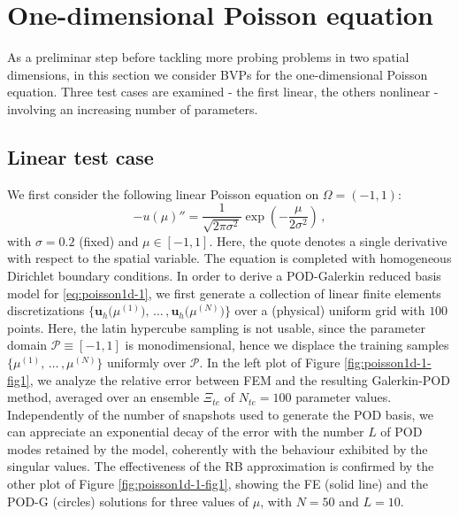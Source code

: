 \documentclass[12pt, a4paper, twoside, openright]{report}
\numberwithin{equation}{chapter}
\theoremstyle{theorem}
\theoremstyle{definition}
\theoremstyle{remark}
\theoremstyle{proposition}
\numberwithin{figure}{chapter}
\begin{document}
	\section{One-dimensional Poisson equation}
	\label{section:One-dimensional Poisson equation (results)}
	
		As a preliminar step before tackling more probing problems in two spatial dimensions, in this section we consider BVPs for the one-dimensional Poisson equation. Three test cases are examined - the first linear, the others nonlinear - involving an increasing number of parameters. 
		
	\vspace*{0.3cm}
	
	\subsection{Linear test case}
	\label{section:poisson1d-1}
	
		We first consider the following linear Poisson equation on $\Omega = (-1,1)$:
		\begin{equation}
			\label{eq:poisson1d-1}
			- u(\mu)'' = \dfrac{1}{\sqrt{2 \pi \sigma^2}} \exp \left( -\dfrac{\mu}{2 \sigma^2} \right) \, ,
		\end{equation}
		with $\sigma = 0.2$ (fixed) and $\mu \in [-1,1]$. Here, the quote denotes a single derivative with respect to the spatial variable. The equation is completed with homogeneous Dirichlet boundary conditions. In order to derive a POD-Galerkin reduced basis model for \eqref{eq:poisson1d-1}, we first generate a collection of linear finite elements discretizations $\big\lbrace \mathbf{u}_h \big( \mu^{(1)} \big), \, \ldots \, , \mathbf{u}_h \big( \mu^{(N)} \big) \big\rbrace$ over a (physical) uniform grid with $100$ points. Here, the latin hypercube sampling is not usable, since the parameter domain $\mathcal{P} \equiv [-1,1]$ is monodimensional, hence we displace the training samples $\big\lbrace \mu^{(1)}, \, \ldots \, , \mu^{(N)} \big\rbrace$ uniformly over $\mathcal{P}$. In the left plot of Figure \ref{fig:poisson1d-1-fig1}, we analyze the relative error between FEM and the resulting Galerkin-POD method, averaged over an ensemble $\Xi_{te}$ of $N_{te} = 100$ parameter values. Independently of the number of snapshots used to generate the POD basis, we can appreciate an exponential decay of the error with the number $L$ of POD modes retained by the model, coherently with the behaviour exhibited by the singular values. The effectiveness of the RB approximation is confirmed by the other plot of Figure \ref{fig:poisson1d-1-fig1}, showing the FE (solid line) and the POD-G (circles) solutions for three values of $\mu$, with $N = 50$ and $L = 10$.
		
\end{document}

